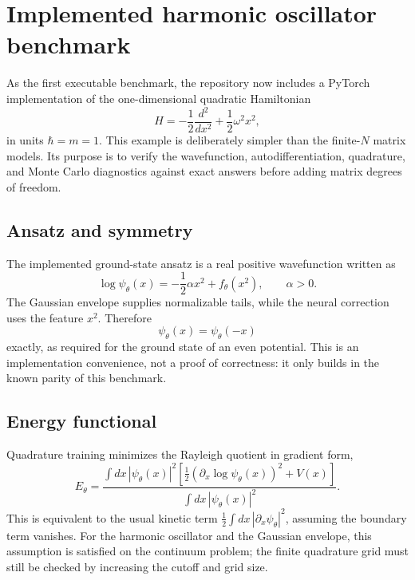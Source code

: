 \documentclass[11pt]{article}
\begin{document}
\section{Implemented harmonic oscillator benchmark}

As the first executable benchmark, the repository now includes a PyTorch
implementation of the one-dimensional quadratic Hamiltonian
\begin{equation}
  H = -\frac{1}{2}\frac{d^2}{dx^2}
      +\frac{1}{2}\omega^2 x^2 ,
\end{equation}
in units \(\hbar=m=1\).  This example is deliberately simpler than the
finite-\(N\) matrix models.  Its purpose is to verify the wavefunction,
autodifferentiation, quadrature, and Monte Carlo diagnostics against exact
answers before adding matrix degrees of freedom.

\subsection{Ansatz and symmetry}

The implemented ground-state ansatz is a real positive wavefunction written as
\begin{equation}
  \log \psi_\theta(x)
  =
  -\frac{1}{2}\alpha x^2 + f_\theta(x^2),
  \qquad \alpha>0 .
\end{equation}
The Gaussian envelope supplies normalizable tails, while the neural correction
uses the feature \(x^2\).  Therefore
\begin{equation}
  \psi_\theta(x)=\psi_\theta(-x)
\end{equation}
exactly, as required for the ground state of an even potential.  This is an
implementation convenience, not a proof of correctness: it only builds in the
known parity of this benchmark.

\subsection{Energy functional}

Quadrature training minimizes the Rayleigh quotient in gradient form,
\begin{equation}
  E_\theta =
  \frac{
    \int dx\,|\psi_\theta(x)|^2
    \left[
      \frac{1}{2}\left(\partial_x\log\psi_\theta(x)\right)^2
      + V(x)
    \right]
  }{
    \int dx\,|\psi_\theta(x)|^2
  } .
\end{equation}
This is equivalent to the usual kinetic term
\(\frac{1}{2}\int dx\,|\partial_x\psi_\theta|^2\), assuming the boundary term
vanishes.  For the harmonic oscillator and the Gaussian envelope, this
assumption is satisfied on the continuum problem; the finite quadrature grid
must still be checked by increasing the cutoff and grid size.
\end{document}

